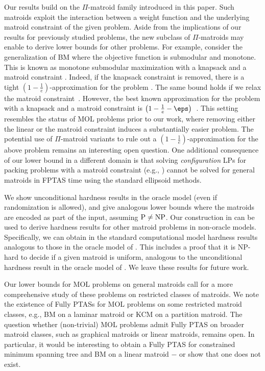  Our results build on the $\Pi$-matroid family introduced in this paper. Such matroids exploit the interaction between a weight function and the underlying matroid constraint of the given problem. Aside from the implications of our results for previously studied problems,
 the new subclass of $\Pi$-matroids may enable to derive lower bounds for 
 other problems. For example, consider the generalization of BM where the objective function is submodular and monotone.
 This is known as monotone submodular maximization with a knapsack and a matroid constraint \cite{chekuri2010dependent}. Indeed, if the knapsack constraint is removed, there is a tight $\left(1-\frac{1}{e} \right)$-approximation for the problem \cite{calinescu2011maximizing}. The same bound holds if we relax the matroid constraint~\cite{sviridenko2004note}. However, the best known approximation for the problem with a knapsack and a matroid constraint
 is $\left(1-\frac{1}{e} -\eps \right)$~\cite{chekuri2010dependent}. This setting resembles the status of MOL problems prior to our work, where removing either the linear or the matroid constraint induces a substantially easier problem. 
 The potential use of $\Pi$-matroid variants to rule out a
 $\left(1-\frac{1}{e} \right)$-approximation for %
 the above problem remains an interesting open question. One additional consequence of our lower bound in a different domain is that solving {\em configuration} LPs for packing problems with a matroid constraint (e.g., \cite{grage2019eptas,doron2023afptas}) cannot be solved for general matroids in FPTAS time using the standard ellipsoid methods. 
 

We show unconditional hardness results in the oracle model (even if randomization is allowed), and give analogous lower bounds where the matroids are encoded as part of the input, assuming $\textnormal{P} \neq \textnormal{NP}$. Our construction in  can be used to derive hardness results for other matroid problems in non-oracle models.
Specifically, we can obtain in the standard computational model
hardness results analogous to those in the oracle model of \cite{JK82}.
This includes a proof that it is NP-hard to decide if a given matroid is uniform, analogous to the unconditional hardness result in the oracle model of \cite{JK82}. We leave these results for future work. 

Our lower bounds for MOL problems on general matroids call for a more comprehensive study of these problems on restricted classes of matroids. We note the existence of Fully PTASs for MOL problems on some restricted matroid classes, e.g., BM on a laminar matroid
 or KCM on a partition matroid.
The question whether (non-trivial) MOL problems admit Fully PTAS on broader matroid classes,
 such as graphical matroids or linear matroids, remains open.
In particular, it would be interesting to obtain a Fully PTAS for {\sc constrained minimum spanning tree} \cite{HL04} and BM on a linear matroid $-$ or show that one does not exist. 
				
				
				\newpage